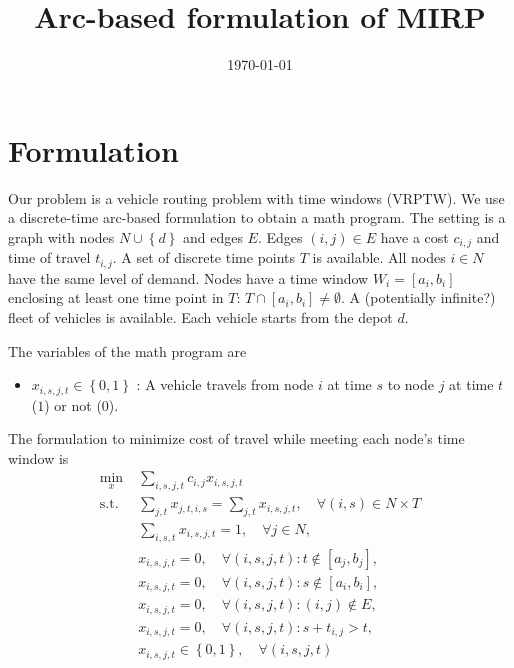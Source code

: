 \documentclass[11pt]{article}
\title{Arc-based formulation of MIRP}
\date{\today}
\theoremstyle{definition}
\newcommand{\st}{\mathrm{s.t.}\;}
\newcommand{\set}[1]{\left\{ #1 \right\}}
\newcommand{\0}{\mathbf{0}}
\begin{document}
\maketitle
\section{Formulation}

Our problem is a vehicle routing problem with time windows (VRPTW).
We use a discrete-time arc-based formulation to obtain a math program.
The setting is a graph with nodes $N \cup \set{d}$ and edges $E$.
Edges $(i,j) \in E$ have a cost $c_{i,j}$ and time of travel $t_{i,j}$.
A set of discrete time points $T$ is available.
All nodes $i \in N$ have the same level of demand.
Nodes have a time window $W_i = [a_i,b_i]$ enclosing at least one time point in $T$: $T \cap [a_i,b_i] \neq \emptyset$.
A (potentially infinite?) fleet of vehicles is available.
Each vehicle starts from the depot $d$.

The variables of the math program are
\begin{itemize}
\item $x_{i,s,j,t} \in \set{0,1}$ : A vehicle travels from node $i$ at time $s$ to node $j$ at time $t$ ($1$) or not ($0$).
\end{itemize}


The formulation to minimize cost of travel while meeting each node's time window is
\begin{align}
\min_x\; & \sum_{i,s,j,t} c_{i,j} x_{i,s,j,t} \\
\st
&\label{con:1}  \sum_{j,t} x_{j,t,i,s} = \sum_{j,t} x_{i,s,j,t}, \quad \forall (i,s) \in N \times T \\
&\label{con:2}  \sum_{i,s,t} x_{i,s,j,t} = 1, \quad \forall j \in N, \\
&\label{con:31} x_{i,s,j,t} = 0, \quad \forall (i,s,j,t): t \notin [a_j,b_j], \\
&\label{con:32} x_{i,s,j,t} = 0, \quad \forall (i,s,j,t): s \notin [a_i,b_i], \\
&\label{con:4}  x_{i,s,j,t} = 0, \quad \forall (i,s,j,t): (i,j) \notin E, \\
&\label{con:5}  x_{i,s,j,t} = 0, \quad \forall (i,s,j,t): s + t_{i,j} > t, \\
&               x_{i,s,j,t} \in \set{0,1}, \quad \forall (i,s,j,t)
\end{align}
\end{document}
